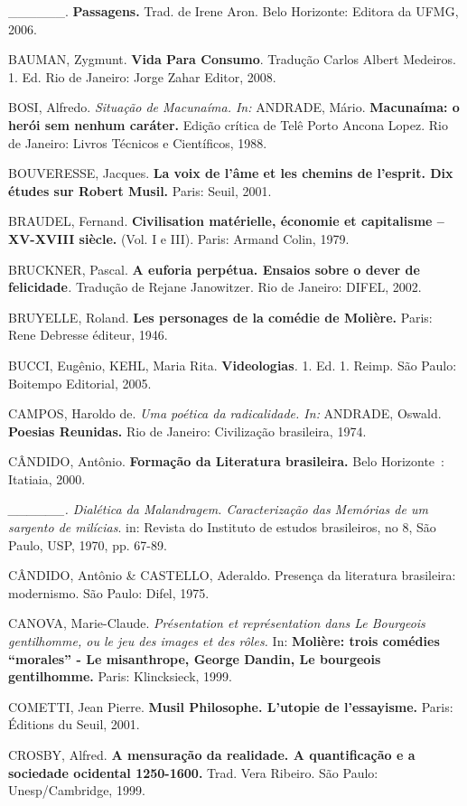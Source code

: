 \_\_\_\_\_\_. \textbf{Passagens.} Trad. de Irene Aron. Belo Horizonte:
Editora da UFMG, 2006.

BAUMAN, Zygmunt. \textbf{Vida Para Consumo}. Tradução Carlos Albert
Medeiros. 1. Ed. Rio de Janeiro: Jorge Zahar Editor, 2008.

BOSI, Alfredo. \emph{Situação de Macunaíma. In:} ANDRADE, Mário.
\textbf{Macunaíma: o herói sem nenhum caráter.} Edição crítica de Telê
Porto Ancona Lopez. Rio de Janeiro: Livros Técnicos e Científicos, 1988.

BOUVERESSE, Jacques. \textbf{La voix de l'âme et les chemins de
l'esprit. Dix études sur Robert Musil.} Paris: Seuil, 2001.

BRAUDEL, Fernand. \textbf{Civilisation matérielle, économie et
capitalisme -- XV-XVIII siècle.} (Vol. I e III). Paris: Armand Colin,
1979.

BRUCKNER, Pascal. \textbf{A euforia perpétua. Ensaios sobre o dever de
felicidade}\emph{.} Tradução de Rejane Janowitzer. Rio de Janeiro:
DIFEL, 2002.

BRUYELLE, Roland. \textbf{Les personages de la comédie de Molière.}
Paris: Rene Debresse éditeur, 1946.

BUCCI, Eugênio, KEHL, Maria Rita. \textbf{Videologias}\emph{.} 1. Ed. 1.
Reimp. São Paulo: Boitempo Editorial, 2005.

CAMPOS, Haroldo de. \emph{Uma poética da radicalidade. In:} ANDRADE,
Oswald. \textbf{Poesias Reunidas.} Rio de Janeiro: Civilização
brasileira, 1974.

CÂNDIDO, Antônio. \textbf{Formação da Literatura brasileira.} Belo
Horizonte~: Itatiaia, 2000.

\emph{\_\_\_\_\_\_. Dialética da Malandragem. Caracterização das
Memórias de um sargento de milícias}. in: Revista do Instituto de
estudos brasileiros, no 8, São Paulo, USP, 1970, pp. 67-89.

CÂNDIDO, Antônio \& CASTELLO, Aderaldo. Presença da literatura
brasileira: modernismo. São Paulo: Difel, 1975.

CANOVA, Marie-Claude. \emph{Présentation et représentation dans Le
Bourgeois gentilhomme, ou le jeu des images et des rôles.} In:
\textbf{Molière: trois comédies ``morales'' - Le misanthrope, George
Dandin, Le bourgeois gentilhomme.} Paris: Klincksieck, 1999.

COMETTI, Jean Pierre. \textbf{Musil Philosophe. L'utopie de
l'essayisme.} Paris: Éditions du Seuil, 2001.

CROSBY, Alfred. \textbf{A mensuração da realidade. A quantificação e a
sociedade ocidental 1250-1600.} Trad. Vera Ribeiro. São Paulo:
Unesp/Cambridge, 1999.

